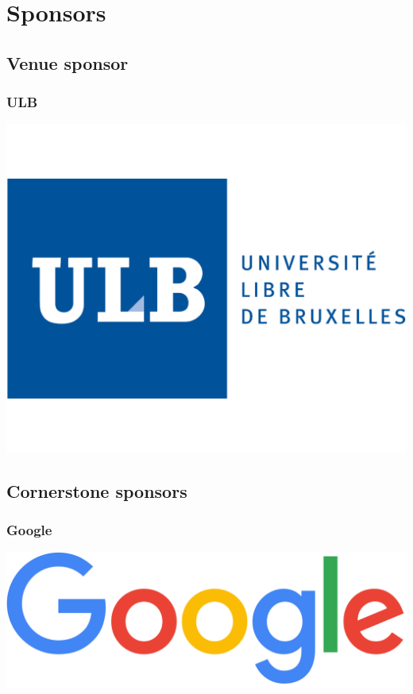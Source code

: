 \documentclass[aspectratio=169]{beamer}
\begin{document}
\section{Sponsors}


\subsection{Venue sponsor}


\begin{frame}
	\frametitle{ULB}
		\includegraphics[scale=1.5]{images/logo_ulb.png}
\end{frame}


\subsection{Cornerstone sponsors}


\begin{frame}
	\frametitle{Google}
	\vfill
		\includegraphics[scale=0.25]{images/google.png}
	\vfill
\end{frame}
\end{document}
